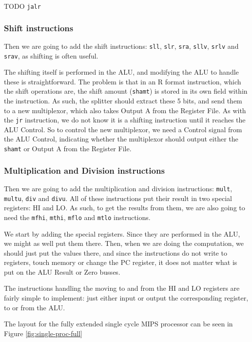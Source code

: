 TODO \texttt{jalr}

\subsubsection*{Shift instructions}
Then we are going to add the shift instructions: \texttt{sll}, \texttt{slr},
\texttt{sra}, \texttt{sllv}, \texttt{srlv} and \texttt{srav}, as shifting is
often useful.

The shifting itself is performed in the ALU, and modifying the ALU to handle
these is straightforward. The problem is that in an R format instruction, which
the shift operations are, the shift amount (\texttt{shamt}) is stored in its
own field within the instruction. As such, the splitter should extract these 5
bits, and send them to a new multiplexor, which also takes Output A from the
Register File. As with the \texttt{jr} instruction, we do not know it is a
shifting instruction until it reaches the ALU Control. So to control the new
multiplexor, we need a Control signal from the ALU Control, indicating whether
the multiplexor should output either the \texttt{shamt} or Output A from the
Register File.

\subsubsection*{Multiplication and Division instructions}
Then we are going to add the multiplication and division instructions:
\texttt{mult}, \texttt{multu}, \texttt{div} and \texttt{divu}. All of these
instructions put their result in two special registers: HI and LO. As such, to
get the results from them, we are also going to need the \texttt{mfhi},
\texttt{mthi}, \texttt{mflo} and \texttt{mtlo} instructions.

We start by adding the special registers. Since they are performed in the ALU,
we might as well put them there. Then, when we are doing the computation, we
should just put the values there, and since the instructions do not write to
registers, touch memory or change the PC register, it does not matter what is
put on the ALU Result or Zero busses.

The instructions handling the moving to and from the HI and LO registers are
fairly simple to implement: just either input or output the corresponding
register, to or from the ALU.

The layout for the fully extended single cycle MIPS processor can be seen in
Figure \ref{fig:single-proc-full}


